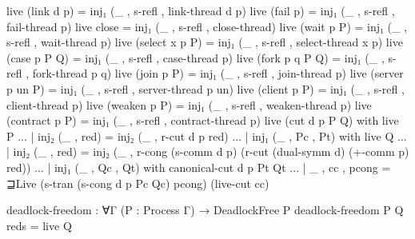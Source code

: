 \begin{code}[hide]
live (link d p) = inj₁ (_ , s-refl , link-thread d p)
live (fail p) = inj₁ (_ , s-refl , fail-thread p)
live close = inj₁ (_ , s-refl , close-thread)
live (wait p P) = inj₁ (_ , s-refl , wait-thread p)
live (select x p P) = inj₁ (_ , s-refl , select-thread x p)
live (case p P Q) = inj₁ (_ , s-refl , case-thread p)
live (fork p q P Q) = inj₁ (_ , s-refl , fork-thread p q)
live (join p P) = inj₁ (_ , s-refl , join-thread p)
live (server p un P) = inj₁ (_ , s-refl , server-thread p un)
live (client p P) = inj₁ (_ , s-refl , client-thread p)
live (weaken p P) = inj₁ (_ , s-refl , weaken-thread p)
live (contract p P) = inj₁ (_ , s-refl , contract-thread p)
live (cut d p P Q) with live P
... | inj₂ (_ , red) = inj₂ (_ , r-cut d p red)
... | inj₁ (_ , Pc , Pt) with live Q
... | inj₂ (_ , red) = inj₂ (_ , r-cong (s-comm d p) (r-cut (dual-symm d) (+-comm p) red))
... | inj₁ (_ , Qc , Qt) with canonical-cut d p Pt Qt
... | _ , cc , pcong = ⊒Live (s-tran (s-cong d p Pc Qc) pcong) (live-cut cc)
\end{code}

\begin{code}
deadlock-freedom : ∀{Γ} (P : Process Γ) → DeadlockFree P
deadlock-freedom P Q reds = live Q
\end{code}